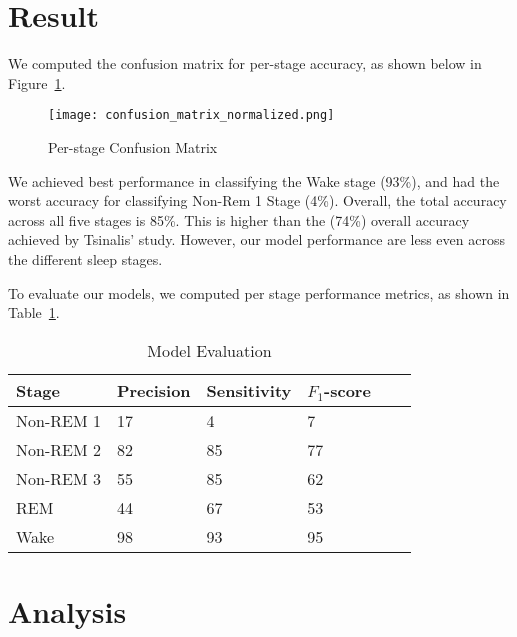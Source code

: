 \documentclass{amia}
\begin{document}
\section*{Result}


We computed the confusion matrix for per-stage accuracy, as shown below in Figure~\ref{fig:figure1}.

\begin{figure}[htb]
\begin{center}
\texttt{[image: confusion\_matrix\_normalized.png]}
\end{center}
\caption{Per-stage Confusion Matrix}
\label{fig:figure1}
\end{figure}

We achieved best performance in classifying the Wake stage (93\%), and had the worst accuracy for classifying Non-Rem 1 Stage (4\%). Overall, the total accuracy across all five stages is 85\%. This is higher than the (74\%) overall accuracy achieved by Tsinalis' study. However, our model performance are less even across the different sleep stages. 

To evaluate our models, we computed per stage performance metrics, as shown in Table~\ref{tab:c}. 

\begin{table}[h]
\centering
\caption{Model Evaluation}\label{tab:c}
\begin{tabular}{| l | l | l | l | l | l |}
\hline
Stage & Precision & Sensitivity & $F_{1}$-score \\ \hline
Non-REM 1 & 17 & 4 & 7 \\ \hline
Non-REM 2 & 82 & 85 & 77 \\ \hline
Non-REM 3 & 55 & 85 & 62 \\ \hline
REM & 44 & 67 & 53 \\ \hline
Wake & 98 & 93 & 95 \\ \hline

\end{tabular}
\end{table}

\section*{Analysis}
\end{document}
